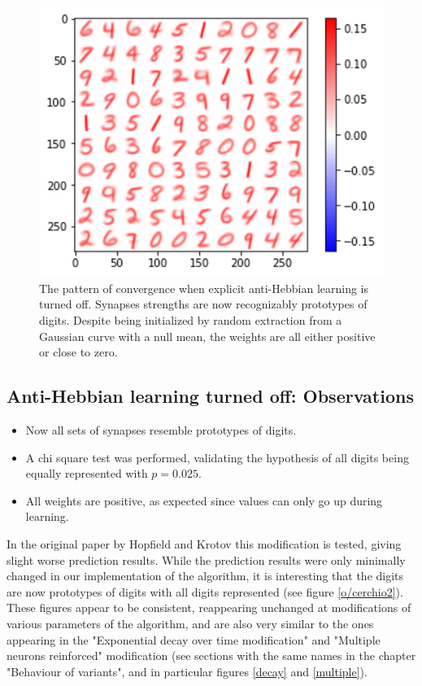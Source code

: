 \documentclass[a4paper]{report}
\begin{document}
\begin{figure} [H]
    \centering
    \includegraphics [width=12cm ] {h/nodelta.png}
    \caption{The pattern of convergence when explicit anti-Hebbian learning is turned off. Synapses strengths are now recognizably prototypes of digits. Despite being initialized by random extraction from a Gaussian curve with a null mean, the weights are all either positive or close to zero.}
    \label{nodelta}
\end{figure}

\subsection{Anti-Hebbian learning turned off: Observations}

\begin{itemize}
    \item Now all sets of synapses resemble prototypes of digits.
    \item A chi square test was performed, validating the hypothesis of all digits being equally represented with $p  = 0.025$.
    \item All weights are positive, as expected since values can only go up during learning.
\end{itemize}

In the original paper by Hopfield and Krotov this modification is tested, giving slight worse prediction results.
While the prediction results were only minimally changed in our implementation of the algorithm, it is interesting that the digits are now prototypes of digits with all digits represented (see figure \ref{o/cerchio2}).
These figures appear to be consistent, reappearing unchanged at modifications of various parameters of the algorithm, and are also very similar to the ones appearing in the "Exponential decay over time modification" and "Multiple neurons reinforced" modification (see sections with the same names in the chapter "Behaviour of variants", and in particular figures \ref{decay} and \ref{multiple}).
\end{document}
